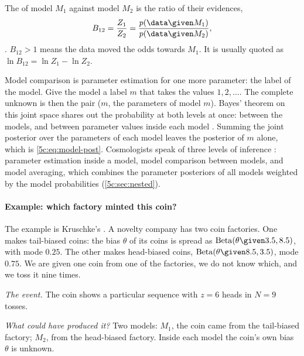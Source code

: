 \begin{workdef}
The  of model $M_1$ against model $M_2$ is the ratio of their
evidences,
\[
  B_{12}=\frac{Z_1}{Z_2}=\frac{p(\data\given M_1)}{p(\data\given M_2)} ,
\]
. $B_{12}>1$ means the data moved the odds towards $M_1$. It is usually quoted
as $\ln B_{12}=\ln Z_1-\ln Z_2$.
\end{workdef}

Model comparison is parameter estimation for one more parameter: the label of the
model. Give the model a label $m$ that takes the values $1,2,\dots$. The complete
unknown is then the pair ($m$, the parameters of model $m$). Bayes' theorem on this
joint space shares out the probability at both levels at once: between the models,
and between parameter values inside each model
. Summing the joint posterior over
the parameters of each model leaves the posterior of $m$ alone, which is
\eqref{5c:eq:model-post}. Cosmologists speak of three levels of inference
: parameter estimation inside a model, model comparison
between models, and model averaging, which combines the parameter posteriors of all
models weighted by the model probabilities (\cref{5c:sec:nested}).

\paragraph{Example: which factory minted this coin?}
The example is Kruschke's . A novelty company has two coin
factories. One makes tail-biased coins: the bias $\theta$  of its coins is spread as $\mathrm{Beta}(\theta\given 3.5,8.5)$, with mode
$0.25$. The other makes head-biased coins, $\mathrm{Beta}(\theta\given 8.5,3.5)$,
mode $0.75$. We are given one coin from one of the factories, we do not know which,
and we toss it nine times.

\emph{The event.} The coin shows a particular sequence with $z=6$ heads in $N=9$
tosses.

\emph{What could have produced it?} Two models: $M_1$, the coin came from the
tail-biased factory; $M_2$, from the head-biased factory. Inside each model the
coin's own bias $\theta$ is unknown.

